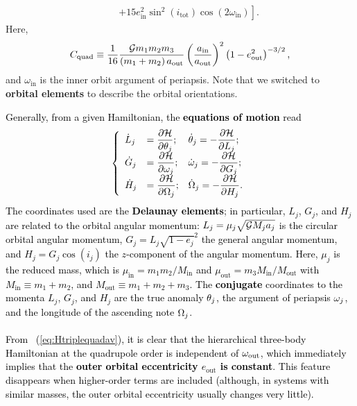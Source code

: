 \documentclass[main.tex]{subfiles}
\begin{document}
\begin{tcolorbox}[sharp corners, colback=green!30, colframe=green!80!blue, title=Orbital Dynamics VI$^{10}$]
{\begin{align}
&\quad \left. + 15 e_\mathrm{in}^2 \sin^2(i_\mathrm{tot}) \cos(2\omega_\mathrm{in}) \right ].
\end{align} 
Here, 
\begin{align}
C_\mathrm{quad} \equiv \frac{1}{16} \frac{\mathcal{G} m_1m_2m_3}{(m_1+m_2) \, a_\mathrm{out}} \left (\frac{a_\mathrm{in}}{a_\mathrm{out}} \right )^2 \left (1 - e_\mathrm{out}^2 \right )^{-3/2},
\end{align}
and $\omega_\mathrm{in}$ is the inner orbit argument of periapsis. Note that we switched to {\bf orbital elements} to describe the orbital orientations. 
}  
\end{tcolorbox}

\begin{tcolorbox}[sharp corners, colback=green!30, colframe=green!80!blue, title=Orbital Dynamics VI$^{10}$ (continued)]
\par \textcolor{black}{
Generally, from a given Hamiltonian, the {\bf equations of motion} read
\begin{align}
\label{eq:Hameq}
\left \{ \begin{array}{lll}
\displaystyle \dot{L}_j &= \displaystyle \frac{\partial \mathcal{H}}{\partial \theta_j}; & \dot{\theta}_j = \displaystyle - \frac{\partial \mathcal{H}}{\partial L_j}; \\
\displaystyle \dot{G}_j &= \displaystyle \frac{\partial \mathcal{H}}{\partial \omega_j}; & \dot{\omega}_j = \displaystyle - \frac{\partial \mathcal{H}}{\partial G_j}; \\
\displaystyle \dot{H}_j &= \displaystyle \frac{\partial \mathcal{H}}{\partial \Omega_j}; & \dot{\Omega}_j = \displaystyle - \frac{\partial \mathcal{H}}{\partial H_j}. \\
\end{array} \right.
\end{align}
The coordinates used are the {\bf Delaunay elements}; in particular, $L_j$, $G_j$, and $H_j$ are related to the orbital angular momentum: $L_j = \mu_j \sqrt{\mathcal{G} M_j a_j}$ is the circular orbital angular momentum, $G_j = L_j \sqrt{1-e_j}^2$ the general angular momentum, and $H_j = G_j \cos (i_j)$ the $z$-component of the angular momentum. Here, $\mu_j$ is the reduced mass, which is $\mu_\mathrm{in} = m_1m_2/M_\mathrm{in}$ and $\mu_\mathrm{out} = m_3 M_\mathrm{in}/M_\mathrm{out}$ with $M_\mathrm{in} \equiv m_1+m_2$, and $M_\mathrm{out} \equiv m_1+m_2+m_3$. The {\bf conjugate} coordinates to the momenta $L_j$, $G_j$, and $H_j$ are the true anomaly $\theta_j$, the argument of periapsis $\omega_j$, and the longitude of the ascending note $\Omega_j$. \\ \\
From \Eq~(\ref{eq:Htriplequadav}), it is clear that the hierarchical three-body Hamiltonian at the quadrupole order is independent of $\omega_\mathrm{out}$, which immediately implies that the {\bf outer orbital eccentricity $e_\mathrm{out}$ is constant}. This feature disappears when higher-order terms are included (although, in systems with similar masses, the outer orbital eccentricity usually changes very little). 
}
\end{tcolorbox}
\end{document}
